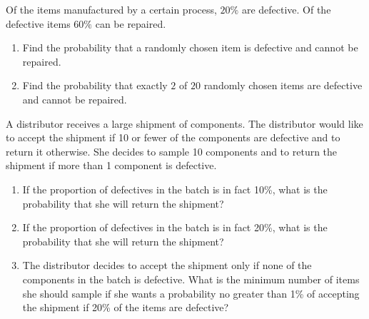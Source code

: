 \documentclass[11pt]{article}
\theoremstyle{mystyle}
\newtheorem{pproblem}{Problem}
\begin{document}
\begin{psproblem}{}{}
    Of the items manufactured by a certain process, $20\%$ are defective. Of the defective items $60\%$ can be repaired.
    \begin{enumerate}[label=\alph*.]
        \item Find the probability that a randomly chosen item is defective and cannot be repaired.
        \item Find the probability that exactly $2$ of $20$ randomly chosen items are defective and cannot be repaired.
    \end{enumerate}
\end{psproblem}
\begin{psproblem}{}{}
    A distributor receives a large shipment of components. The distributor would like to accept the shipment if 10
    or fewer of the components are defective and to return it otherwise. She decides to sample 10 components and to
    return the shipment if more than 1 component is defective.
    \begin{enumerate}[label=\alph*.]
        \item If the proportion of defectives in the batch is in fact 10\%, what is the probability that she will return the
        shipment?
        \item If the proportion of defectives in the batch is in fact 20\%, what is the probability that she will return the
        shipment?
        \item The distributor decides to accept the shipment only if none of the components in the batch is defective. What
        is the minimum number of items she should sample if she wants a probability no greater than 1\% of accepting
        the shipment if 20\% of the items are defective?
    \end{enumerate}
\end{psproblem}





%
%
\end{document}
